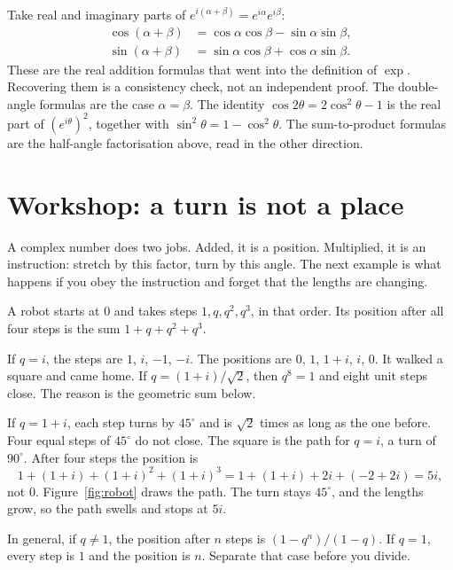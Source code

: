 \begin{examplex}
Take real and imaginary parts of $e^{i(\alpha+\beta)}=e^{i\alpha}e^{i\beta}$:
\begin{align*}
\cos(\alpha+\beta)&=\cos\alpha\cos\beta-\sin\alpha\sin\beta,\\
\sin(\alpha+\beta)&=\sin\alpha\cos\beta+\cos\alpha\sin\beta.
\end{align*}
These are the real addition formulas that went into the definition of $\exp$. Recovering them is a consistency check, not an independent proof. The double-angle formulas are the case $\alpha=\beta$. The identity $\cos2\theta=2\cos^2\theta-1$ is the real part of $(e^{i\theta})^2$, together with $\sin^2\theta=1-\cos^2\theta$. The sum-to-product formulas are the half-angle factorisation above, read in the other direction.
\end{examplex}

\section{Workshop: a turn is not a place}

A complex number does two jobs. Added, it is a position. Multiplied, it is an instruction: stretch by this factor, turn by this angle. The next example is what happens if you obey the instruction and forget that the lengths are changing.

\begin{examplex}
A robot starts at $0$ and takes steps $1,q,q^2,q^3$, in that order. Its position after all four steps is the sum $1+q+q^2+q^3$.

If $q=i$, the steps are $1$, $i$, $-1$, $-i$. The positions are $0$, $1$, $1+i$, $i$, $0$. It walked a square and came home. If $q=(1+i)/\sqrt2$, then $q^8=1$ and eight unit steps close. The reason is the geometric sum below.

If $q=1+i$, each step turns by $45^\circ$ and is $\sqrt2$ times as long as the one before. Four equal steps of $45^\circ$ do not close. The square is the path for $q=i$, a turn of $90^\circ$. After four steps the position is
\[
1+(1+i)+(1+i)^2+(1+i)^3=1+(1+i)+2i+(-2+2i)=5i,
\]
not $0$. Figure~\ref{fig:robot} draws the path. The turn stays $45^\circ$, and the lengths grow, so the path swells and stops at $5i$.

In general, if $q\ne1$, the position after $n$ steps is $(1-q^n)/(1-q)$. If $q=1$, every step is $1$ and the position is $n$. Separate that case before you divide.
\end{examplex}

